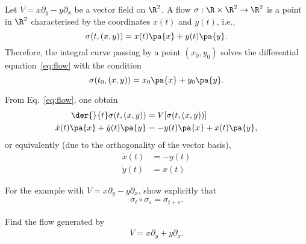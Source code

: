 \begin{WEbox}[%
    frametitle={Finding the integral curve},
    frametitlerule=true,
    frametitlealignment=\centering,
    frametitleaboveskip=10pt,]
  Let $V = x \partial_y - y \partial_x$ be a vector field on $\R^2$. A flow $\sigma:\R\times \R^2 \to \R^2$ is a point in $\R^2$ characterised by the coordinates $x(t)$ and $y(t)$, i.e.,
  \begin{equation}
    \sigma(t,(x,y)) = x(t) \pa{x} + y(t) \pa{y}.
  \end{equation}
  Therefore, the integral curve passing by a point $(x_0,y_0)$ solves the differential equation~\eqref{eq:flow} with the condition
  \begin{equation*}
    \sigma(t_0,(x,y)) = x_0 \pa{x} + y_0 \pa{y}.
  \end{equation*}

  From Eq.~\eqref{eq:flow}, one obtain 
  \begin{align*}
    \der{}{t}\sigma(t,(x,y)) &= V[\sigma(t,(x,y))] \\
    \dot{x}(t) \pa{x} + \dot{y}(t) \pa{y} &= -y(t) \pa{x} + x(t) \pa{y},
  \end{align*}
  or equivalently (due to the orthogonality of the vector basis),
  \begin{align*}
    \dot{x}(t) &= -y(t)  \\
    \dot{y}(t) &= x(t)
  \end{align*}
\end{WEbox}

\begin{Ebox}
  For the example with $V = x\partial_y -y \partial_x$, show explicitly that 
  \begin{align}
    \sigma_t\circ \sigma_s = \sigma_{t+s}.
  \end{align}
\end{Ebox}


\begin{Ebox}
  Find the flow generated by
  \begin{align}
    V = x\partial_y +y\partial_x.
  \end{align}
\end{Ebox}

